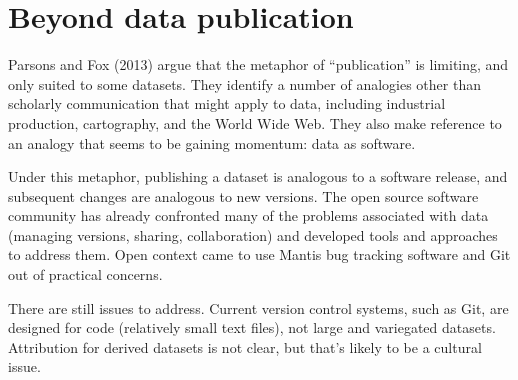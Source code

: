 \documentclass[10pt,a4paper,twocolumn]{article}
\begin{document}

\section*{Beyond data publication}\label{beyond-data-publication}

Parsons and Fox (2013)\cite{parsons_is_2013} argue that the metaphor of ``publication'' is limiting, and only suited to some datasets. 
They identify a number of analogies other than scholarly communication that might apply to data, including industrial production, cartography, and the World Wide Web.
They also make reference to an analogy that seems to be gaining momentum: data as software.\cite{schopf_treating_2012} 

Under this metaphor, publishing a dataset is analogous to a software release, and subsequent changes are analogous to new versions.
The open source software community has already confronted many of the problems associated with data (managing versions, sharing, collaboration) and developed tools and approaches to address them.
Open context came to use Mantis bug tracking software and Git out of practical concerns.

\cite{ram_git_2013}
\cite{chen_close_2014}

There are still issues to address.
Current version control systems, such as Git, are designed for code (relatively small text files), not large and variegated datasets. 
Attribution for derived datasets is not clear, but that's likely to be a cultural issue.


\nocite{*}
{\small
}

\listoftodos






\end{document}
